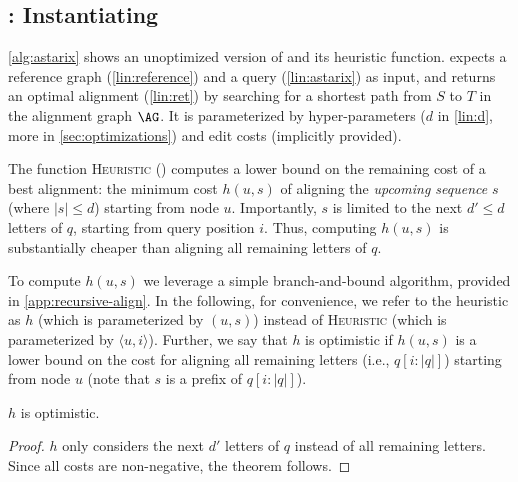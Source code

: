 


\subsection{\astarix: Instantiating \A} \label{subsec:astarix-heuristic}
\cref{alg:astarix} shows an unoptimized version of \astarix and its heuristic
function.
%
\astarix expects a reference graph (\cref{lin:reference}) and a query
(\cref{lin:astarix}) as input, and returns an optimal alignment (\cref{lin:ret})
by searching for a shortest path from $S$ to $T$ in the alignment graph $\AG$.
It is parameterized by hyper-parameters ($d$ in \cref{lin:d}, more in
\cref{sec:optimizations}) and edit costs (implicitly provided).

The function \textsc{Heuristic}
() computes a lower bound on
the remaining cost of a best alignment: the minimum cost $h(u,s)$ of aligning
the \emph{upcoming sequence} $s$ (where $\lvert s \rvert \leq d$) starting from
node $u$. Importantly, $s$ is limited to the next $d' \leq d$ letters of $q$,
starting from query position $i$. Thus, computing $h(u,s)$ is substantially
cheaper than aligning all remaining letters of $q$.

To compute $h(u,s)$ we leverage a simple branch-and-bound algorithm, provided in
\cref{app:recursive-align}. In the following, for convenience, we refer to the
heuristic as $h$ (which is parameterized by $(u,s)$) instead of
\textsc{Heuristic} (which is parameterized by $\langle u, i \rangle$). Further,
we say that $h$ is optimistic if $h(u,s)$ is a lower bound on the cost for
aligning all remaining letters (i.e., $q[i:|q|]$) starting from node $u$ (note
that $s$ is a prefix of $q[i:|q|]$).

\begin{samepage}
\begin{thm} \label{thm:optimistic}
	$h$ is optimistic.
\end{thm}
\begin{proof}
$h$ only considers the next $d'$ letters of $q$ instead of all
remaining letters. Since all costs are non-negative, the theorem follows.
\end{proof}
\end{samepage}

